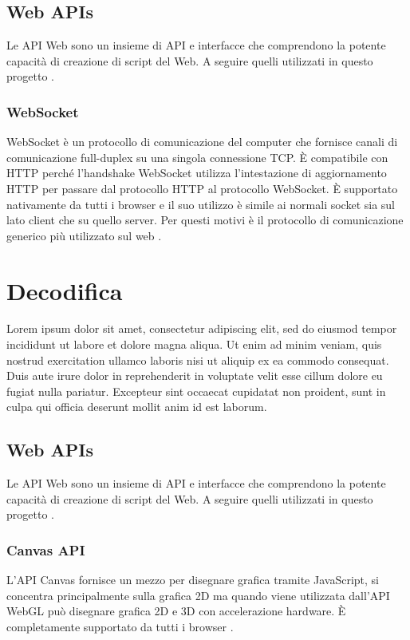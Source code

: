 \subsection{Web APIs}
Le API Web sono un insieme di API e interfacce che comprendono la potente capacità di creazione di script del Web. A seguire quelli utilizzati in questo progetto \parencite{Web_APIs}.

\subsubsection{WebSocket}
WebSocket è un protocollo di comunicazione del computer che fornisce canali di comunicazione full-duplex su una singola connessione TCP. È compatibile con HTTP perché l'handshake WebSocket utilizza l'intestazione di aggiornamento HTTP per passare dal protocollo HTTP al protocollo WebSocket. È supportato nativamente da tutti i browser e il suo utilizzo è simile ai normali socket sia sul lato client che su quello server. Per questi motivi è il protocollo di comunicazione generico più utilizzato sul web \parencite{WebSocket_Web_APIs}.




\section{Decodifica}
Lorem ipsum dolor sit amet, consectetur adipiscing elit, sed do eiusmod tempor incididunt ut labore et dolore magna aliqua. Ut enim ad minim veniam, quis nostrud exercitation ullamco laboris nisi ut aliquip ex ea commodo consequat. Duis aute irure dolor in reprehenderit in voluptate velit esse cillum dolore eu fugiat nulla pariatur. Excepteur sint occaecat cupidatat non proident, sunt in culpa qui officia deserunt mollit anim id est laborum.

\subsection{Web APIs}
Le API Web sono un insieme di API e interfacce che comprendono la potente capacità di creazione di script del Web. A seguire quelli utilizzati in questo progetto \parencite{Web_APIs}.

\subsubsection{Canvas API}
L'API Canvas fornisce un mezzo per disegnare grafica tramite JavaScript, si concentra principalmente sulla grafica 2D ma quando viene utilizzata dall'API WebGL può disegnare grafica 2D e 3D con accelerazione hardware. È completamente supportato da tutti i browser \parencite{Canvas_API}.

